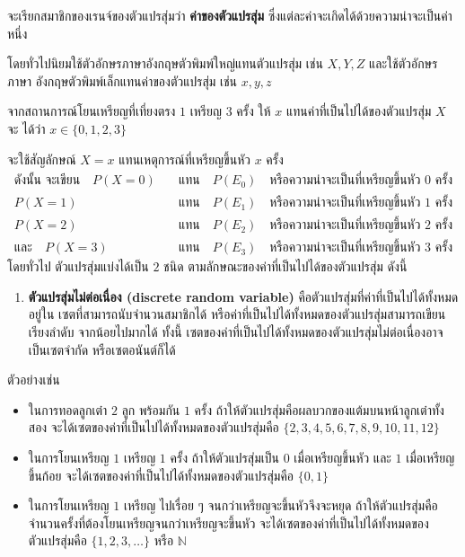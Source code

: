 จะเรียกสมาชิกของเรนจ์ของตัวแปรสุ่มว่า \textbf{ค่าของตัวแปรสุ่ม} ซึ่งแต่ละค่าจะเกิดได้ด้วยความน่าจะเป็นค่าหนึ่ง

โดยทั่วไปนิยมใช้ตัวอักษรภาษาอังกฤษตัวพิมพ์ใหญ่แทนตัวแปรสุ่ม เช่น $X, Y, Z$ และใช้ตัวอักษรภาษา อังกฤษตัวพิมพ์เล็กแทนค่าของตัวแปรสุ่ม เช่น $x, y, z$

จากสถานการณ์โยนเหรียญที่เที่ยงตรง $1$ เหรียญ $3$ ครั้ง ให้ $x$ แทนค่าที่เป็นไปได้ของตัวแปรสุ่ม $X$ จะ ได้ว่า $x \in\{0, 1, 2, 3\}$

จะใช้สัญลักษณ์ $X=x$ แทนเหตุการณ์ที่เหรียญขึ้นหัว $x$ ครั้ง
\begin{align*}
	\text{ดังนั้น จะเขียน} \quad P(X=0) \quad &\text{แทน} \quad P(E_{0}) \quad \text{หรือความน่าจะเป็นที่เหรียญขึ้นหัว } 0 \text{ ครั้ง} \\
	P(X=1) \quad &\text{แทน} \quad P(E_{1}) \quad \text{หรือความน่าจะเป็นที่เหรียญขึ้นหัว } 1 \text{ ครั้ง} \\
	P(X=2) \quad &\text{แทน} \quad P(E_{2}) \quad \text{หรือความน่าจะเป็นที่เหรียญขึ้นหัว } 2 \text{ ครั้ง} \\
	\text{และ} \quad P(X=3) \quad &\text{แทน} \quad P(E_{3}) \quad \text{หรือความน่าจะเป็นที่เหรียญขึ้นหัว } 3 \text{ ครั้ง}
\end{align*}
โดยทั่วไป ตัวแปรสุ่มแบ่งได้เป็น $2$ ชนิด ตามลักษณะของค่าที่เป็นไปได้ของตัวแปรสุ่ม ดังนี้

\begin{enumerate}
	\item \textbf{ตัวแปรสุ่มไม่ต่อเนื่อง (discrete random variable)} คือตัวแปรสุ่มที่ค่าที่เป็นไปได้ทั้งหมดอยู่ใน เซตที่สามารถนับจำนวนสมาชิกได้ หรือค่าที่เป็นไปได้ทั้งหมดของตัวแปรสุ่มสามารถเขียนเรียงลำดับ จากน้อยไปมากได้ ทั้งนี้ เซตของค่าที่เป็นไปได้ทั้งหมดของตัวแปรสุ่มไม่ต่อเนื่องอาจเป็นเซตจำกัด หรือเซตอนันต์ก็ได้
\end{enumerate}

ตัวอย่างเช่น

\begin{itemize}
	\item ในการทอดลูกเต๋า $2$ ลูก พร้อมกัน $1$ ครั้ง ถ้าให้ตัวแปรสุ่มคือผลบวกของแต้มบนหน้าลูกเต๋าทั้งสอง จะได้เซตของค่าที่เป็นไปได้ทั้งหมดของตัวแปรสุ่มคือ $\{2, 3, 4, 5, 6, 7, 8, 9, 10, 11, 12\}$
	\item ในการโยนเหรียญ $1$ เหรียญ $1$ ครั้ง ถ้าให้ตัวแปรสุ่มเป็น $0$ เมื่อเหรียญขึ้นหัว และ $1$ เมื่อเหรียญ ขึ้นก้อย จะได้เซตของค่าที่เป็นไปได้ทั้งหมดของตัวแปรสุ่มคือ $\{0, 1\}$
	\item ในการโยนเหรียญ $1$ เหรียญ ไปเรื่อย ๆ จนกว่าเหรียญจะขึ้นหัวจึงจะหยุด ถ้าให้ตัวแปรสุ่มคือ จำนวนครั้งที่ต้องโยนเหรียญจนกว่าเหรียญจะขึ้นหัว จะได้เซตของค่าที่เป็นไปได้ทั้งหมดของ ตัวแปรสุ่มคือ $\{1, 2, 3, \ldots\}$ หรือ $\mathbb{N}$
\end{itemize}

